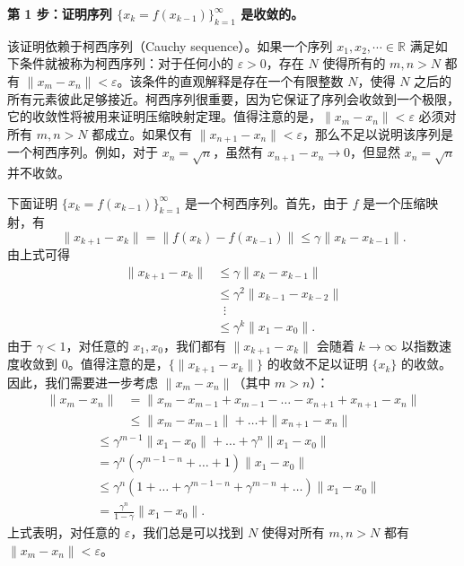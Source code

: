 \begin{derivation}[方框 3.1：压缩映射定理的证明]
\label{box:rl-contraction-proof}
\textbf{第 1 步：证明序列 $\{x_k = f(x_{k-1})\}_{k=1}^{\infty}$ 是收敛的。}

该证明依赖于柯西序列（Cauchy sequence）。如果一个序列 $x_1, x_2, \cdots \in \mathbb{R}$ 满足如下条件就被称为柯西序列：对于任何小的 $\varepsilon > 0$，存在 $N$ 使得所有的 $m, n > N$ 都有 $\|x_m - x_n\| < \varepsilon$。该条件的直观解释是存在一个有限整数 $N$，使得 $N$ 之后的所有元素彼此足够接近。柯西序列很重要，因为它保证了序列会收敛到一个极限，它的收敛性将被用来证明压缩映射定理。值得注意的是，$\|x_m - x_n\| < \varepsilon$ 必须对所有 $m, n > N$ 都成立。如果仅有 $\|x_{n+1} - x_n\| < \varepsilon$，那么不足以说明该序列是一个柯西序列。例如，对于 $x_n = \sqrt{n}$，虽然有 $x_{n+1} - x_n \to 0$，但显然 $x_n = \sqrt{n}$ 并不收敛。

下面证明 $\{x_k = f(x_{k-1})\}_{k=1}^{\infty}$ 是一个柯西序列。首先，由于 $f$ 是一个压缩映射，有
\begin{equation}
  \| x_{k+1} - x_k \| = \| f(x_k) - f(x_{k-1}) \| \leqslant \gamma \| x_k - x_{k-1} \|.
\end{equation}
由上式可得
\begin{equation}
\begin{aligned}
  \| x_{k+1} - x_k \| &\leqslant \gamma \| x_k - x_{k-1} \|\\
  &\leqslant \gamma^2 \| x_{k-1} - x_{k-2} \|\\
  &\;\;\vdots\\
  &\leqslant \gamma^k \| x_1 - x_0 \|.
\end{aligned}
\end{equation}
由于 $\gamma < 1$，对任意的 $x_1, x_0$，我们都有 $\|x_{k+1} - x_k\|$ 会随着 $k \to \infty$ 以指数速度收敛到 0。值得注意的是，$\{\|x_{k+1} - x_k\|\}$ 的收敛不足以证明 $\{x_k\}$ 的收敛。因此，我们需要进一步考虑 $\|x_m - x_n\|$（其中 $m > n$）：
\begin{equation}
\begin{aligned}
  \| x_m - x_n \| &= \| x_m - x_{m-1} + x_{m-1} - \dots - x_{n+1} + x_{n+1} - x_n \|\\
  &\leqslant \| x_m - x_{m-1} \| + \dots + \| x_{n+1} - x_n \|
\end{aligned}
\end{equation}
\begin{equation}
\begin{aligned}
  &\leqslant \gamma^{m-1} \| x_1 - x_0 \| + \dots + \gamma^n \| x_1 - x_0 \|\\
  &= \gamma^n (\gamma^{m-1-n} + \dots + 1) \| x_1 - x_0 \|\\
  &\leqslant \gamma^n (1 + \dots + \gamma^{m-1-n} + \gamma^{m-n} + \ldots) \| x_1 - x_0 \|\\
  &= \frac{\gamma^n}{1 - \gamma} \| x_1 - x_0 \|.
\end{aligned}
\label{eq:rl-cauchy-bound}
\end{equation}
上式表明，对任意的 $\varepsilon$，我们总是可以找到 $N$ 使得对所有 $m, n > N$ 都有 $\|x_m - x_n\| < \varepsilon$。


\end{derivation}
